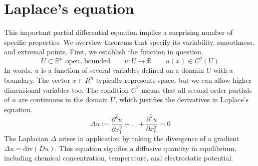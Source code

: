 \documentclass[titlepage]{article}
\renewcommand{\;}{\:\:\:} %
\newcommand{\f}[2]{\frac{#1}{#2}} %
\newcommand{\R}{\mathbb{R}} %
\newcommand{\p}{\partial} %
\theoremstyle{definition}
\theoremstyle{theorem}
\theoremstyle{remark}
\theoremstyle{lemma}
\begin{document}
\section*{Laplace's equation}
This important partial differential equation implies a surprising number of specific properties. We overview theorems that specify its variability, smoothness, and extremal points. First, we establish the function in question.
\begin{equation} \label{def u}
    U \subset \R^n \text{ open, bounded} \qquad  u:U \rightarrow \R \qquad u(x) \in C^2(U) 
\end{equation}
In words, $u$ is a function of several variables defined on a domain $U$ with a boundary. The vector $x \in R^n$ typically represents space, but we can allow higher dimensional variables too. The condition $C^2$ means that all second order partials of $u$ are continuous in the domain $U$, which justifies the derivatives in Laplace's equation.
\begin{equation} \label{Laplace}
    \Delta u := \f{\p^2 u}{\p x_1^2} + ... + \f{\p^2 u}{\p x_n^2} = 0
\end{equation}
The Laplacian $\Delta$ arises in application by taking the divergence of a gradient $\Delta u = \text{div}(Du)$. This equation signifies a diffusive quantity in equilibrium, including chemical concentration, temperature, and electrostatic potential.
\end{document}
